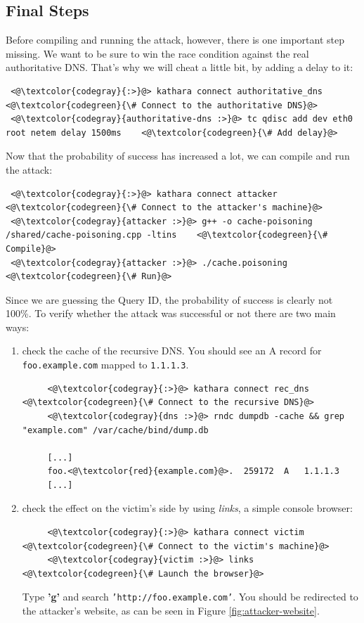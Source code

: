 \documentclass[11pt,a4paper]{article}
\begin{document}
\newpage
\subsection{Final Steps}
\noindent
Before compiling and running the attack, however, there is one important step missing. We want to be sure to win the race condition against the real authoritative DNS. That's why we will cheat a little bit, by adding a delay to it:
\begin{lstlisting}
 <@\textcolor{codegray}{:>}@> kathara connect authoritative_dns  <@\textcolor{codegreen}{\# Connect to the authoritative DNS}@>
 <@\textcolor{codegray}{authoritative-dns :>}@> tc qdisc add dev eth0 root netem delay 1500ms    <@\textcolor{codegreen}{\# Add delay}@>
\end{lstlisting}
\noindent
Now that the probability of success has increased a lot, we can compile and run the attack:
\begin{lstlisting}
 <@\textcolor{codegray}{:>}@> kathara connect attacker  <@\textcolor{codegreen}{\# Connect to the attacker's machine}@>
 <@\textcolor{codegray}{attacker :>}@> g++ -o cache-poisoning /shared/cache-poisoning.cpp -ltins    <@\textcolor{codegreen}{\# Compile}@>
 <@\textcolor{codegray}{attacker :>}@> ./cache.poisoning    <@\textcolor{codegreen}{\# Run}@>
\end{lstlisting}

\noindent
Since we are guessing the Query ID, the probability of success is clearly not 100\%. To verify whether the attack was successful or not there are two main ways:
\begin{enumerate}
    \item check the cache of the recursive DNS. You should see an A record for \texttt{foo.example.com} mapped to \texttt{1.1.1.3}.
    \begin{lstlisting}
     <@\textcolor{codegray}{:>}@> kathara connect rec_dns  <@\textcolor{codegreen}{\# Connect to the recursive DNS}@>
     <@\textcolor{codegray}{dns :>}@> rndc dumpdb -cache && grep "example.com" /var/cache/bind/dump.db     
     
     [...]
     foo.<@\textcolor{red}{example.com}@>.  259172  A   1.1.1.3
     [...]\end{lstlisting}
     \item check the effect on the victim's side by using \textit{links}, a simple console browser:
     \begin{lstlisting}
     <@\textcolor{codegray}{:>}@> kathara connect victim  <@\textcolor{codegreen}{\# Connect to the victim's machine}@>
     <@\textcolor{codegray}{victim :>}@> links    <@\textcolor{codegreen}{\# Launch the browser}@>\end{lstlisting}
     Type \textbf{'g'} and search \texttt{'http://foo.example.com'}. You should be redirected to the attacker's website, as can be seen in Figure \ref{fig:attacker-website}.
\end{enumerate}
\end{document}
